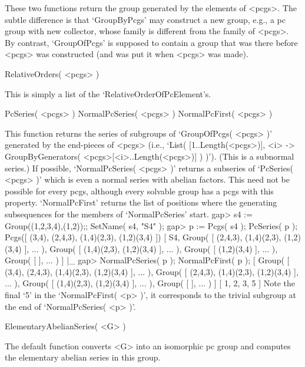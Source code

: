 These two functions return the group generated by the elements of <pcgs>.
The subtle difference is that  `GroupByPcgs' may  construct a new  group,
e.g., a pc group  with new collector, whose  family is different from the
family of <pcgs>.  By contrast,  `GroupOfPcgs'  is supposed to contain  a
group that was there before  <pcgs> was constructed  (and was put it when
<pcgs> was made).

\>RelativeOrders( <pcgs> )

This is simply a list of the `RelativeOrderOfPcElement's.

\>PcSeries( <pcgs> )
\>NormalPcSeries( <pcgs> )
\>NormalPcFirst( <pcgs> )

This function returns the series of subgroups  of `GroupOfPcgs( <pcgs> )'
generated by the end-pieces of  <pcgs> (i.e., `List( [1..Length(<pcgs>)],
<i> -> GroupByGenerators( <pcgs>{[<i>..Length(<pcgs>)]} ) )'). (This is a
subnormal  series.) If possible,  `NormalPcSeries(  <pcgs>  )' returns  a
subseries of `PcSeries(  <pcgs>  )' which  is  even a normal series  with
abelian factors. This need not be possible for every pcgs, although every
solvable group has a pcgs with this property. `NormalPcFirst' returns the
list of positions where the  generating  subsequences for the members  of
`NormalPcSeries' start.
\beginexample
    gap> s4 := Group((1,2,3,4),(1,2));;  SetName( s4, "S4" );
    gap> p := Pcgs( s4 );  PcSeries( p );
    Pcgs([ (3,4), (2,4,3), (1,4)(2,3), (1,2)(3,4) ])
    [ S4, Group( [ (2,4,3), (1,4)(2,3), (1,2)(3,4) ], ... ), 
      Group( [ (1,4)(2,3), (1,2)(3,4) ], ... ), 
      Group( [ (1,2)(3,4) ], ... ), Group( [  ], ... ) ]
|_
    gap> NormalPcSeries( p );  NormalPcFirst( p );
    [ Group( [ (3,4), (2,4,3), (1,4)(2,3), (1,2)(3,4) ], ... ), 
      Group( [ (2,4,3), (1,4)(2,3), (1,2)(3,4) ], ... ), 
      Group( [ (1,4)(2,3), (1,2)(3,4) ], ... ), Group( [  ], ... ) ]
    [ 1, 2, 3, 5 ]
\endexample
Note the final `5' in the  `NormalPcFirst( <p> )',  it corresponds to the
trivial subgroup at the end of `NormalPcSeries( <p> )'.


\>ElementaryAbelianSeries( <G> )

The default  function converts   <G> into an   isomorphic pc   group  and
computes the elementary abelian series in this group.


